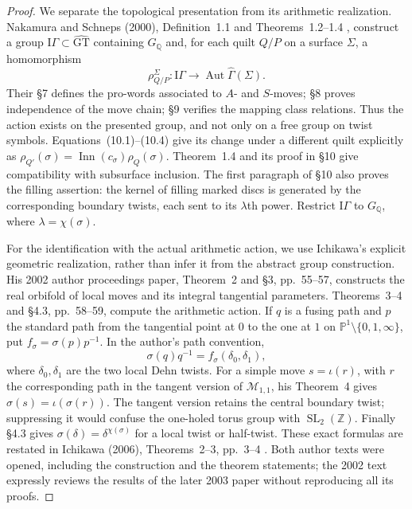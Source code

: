 \begin{proof}
We separate the topological presentation from its arithmetic realization.
Nakamura and Schneps (2000), Definition~1.1 and Theorems~1.2--1.4
\cite{A567_NakamuraSchneps2000},
construct a group $\mathrm I\Gamma\subset\widehat{\mathrm{GT}}$ containing
$G_{\mathbb Q}$ and, for each quilt $Q/P$ on a surface $\Sigma$, a
homomorphism
\[
 \rho^\Sigma_{Q/P}:\mathrm I\Gamma\longrightarrow
       \operatorname{Aut}\widehat\Gamma(\Sigma).
\]
Their \S7 defines the pro-words associated to $A$- and $S$-moves;
\S8 proves independence of the move chain; \S9 verifies the mapping
class relations. Thus the action exists on the presented group, and
not only on a free group on twist symbols. Equations~(10.1)--(10.4)
give its change under a different quilt explicitly as
$\rho_{Q'}(\sigma)=\operatorname{Inn}(c_\sigma)\rho_Q(\sigma)$.
Theorem~1.4
and its proof in \S10 give compatibility with subsurface inclusion.
The first paragraph of \S10 also proves the filling assertion: the
kernel of filling marked discs is generated by the corresponding
boundary twists, each sent to its $\lambda$th power. Restrict
$\mathrm I\Gamma$ to $G_{\mathbb Q}$, where $\lambda=\chi(\sigma)$.

For the identification with the actual arithmetic action, we use
Ichikawa's explicit geometric realization, rather than infer it from
the abstract group construction. His 2002 author proceedings paper,
Theorem~2 and \S3, pp.~55--57, constructs the real orbifold of local
moves and its integral tangential parameters. Theorems~3--4 and
\S4.3, pp.~58--59, compute the arithmetic action. If $q$ is a fusing
path and $p$ the standard path from the tangential point at $0$ to the
one at $1$ on $\mathbb P^1\setminus\{0,1,\infty\}$, put
$f_\sigma=\sigma(p)p^{-1}$. In the author's path convention,
\[
 \sigma(q)q^{-1}=f_\sigma(\delta_0,\delta_1),
\]
where $\delta_0,\delta_1$ are the two local Dehn twists. For a simple
move $s=\iota(r)$, with $r$ the corresponding path in the tangent
version of $\mathcal M_{1,1}$, his Theorem~4 gives
$\sigma(s)=\iota(\sigma(r))$. The tangent version retains the central
boundary twist; suppressing it would confuse the one-holed torus group
with $\operatorname{SL}_2(\mathbb Z)$. Finally \S4.3 gives
$\sigma(\delta)=\delta^{\chi(\sigma)}$ for a local twist or half-twist.
These exact formulas are restated in Ichikawa (2006), Theorems~2--3,
pp.~3--4 \cite{A567_Ichikawa2002,A567_Ichikawa2006}.
Both author texts were opened, including the construction
and the theorem statements; the 2002 text expressly reviews the
results of the later 2003 paper without reproducing all its proofs.


\end{proof}

